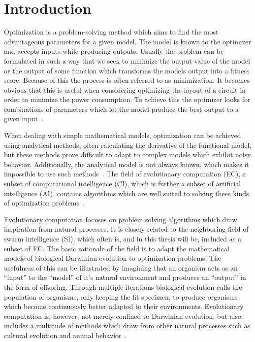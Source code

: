 \section{Introduction}

Optimization is a problem-solving method which aims to find the most advantageous parameters for a given model. The model is known to the optimizer and accepts inputs while producing outputs. Usually the problem can be formulated in such a way that we seek to minimize the output value of the model or the output of some function which transforms the models output into a fitness score. Because of this the process is often referred to as minimization. It becomes obvious that this is useful when considering optimizing the layout of a circuit in order to minimize the power consumption. To achieve this the optimizer looks for combinations of parameters which let the model produce the best output to a given input~\cite{Eiben2015_origins}.


When dealing with simple mathematical models, optimization can be achieved using analytical methods, often calculating the derivative of the functional model, but these methods prove difficult to adapt to complex models which exhibit noisy behavior. Additionally, the analytical model is not always known, which makes it impossible to use such methods~\cite{xiong2015walk}. The field of evolutionary computation (EC), a subset of computational intelligence (CI), which is further a subset of artificial intelligence (AI), contains algorithms which are well suited to solving these kinds of optimization problems~\cite{Michalewicz1997,zhang2015comprehensive}.

Evolutionary computation focuses on problem solving algorithms which draw inspiration from natural processes. It is closely related to the neighboring field of swarm intelligence (SI), which often is, and in this thesis will be, included as a subset of EC. The basic rationale of the field is to adapt the mathematical models of biological Darwinian evolution to optimization problems. The usefulness of this can be illustrated by imagining that an organism acts as an ``input'' to the ``model'' of it's natural environment and produces an ``output'' in the form of offspring. Through multiple iterations biological evolution culls the population of organisms, only keeping the fit specimen, to produce organisms which become continuously better adapted to their environments. Evolutionary computation is, however, not merely confined to Darwinian evolution, but also includes a multitude of methods which draw from other natural processes such as cultural evolution and animal behavior~\cite{engelbrecht2007computational}.

